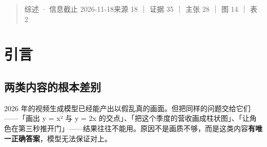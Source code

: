 
\begin{quote}\small
综述 · 信息截止 2026-11-18来源 18 ｜ 证据 35 ｜ 主张 28 ｜ 图 14 ｜ 表 2

\end{quote}

\begin{abstract}

让 AI 生成视频，主流路线是端到端扩散模型：输入文本或图像，直接输出像素。但有一类内容它系统性做不好——精确的公式、正确的图表、规则一致的交互、与画面事件严格同步的旁白。这些内容的共同点是\textbf{存在唯一正确答案}，而像素模型只能给出「看起来像」的结果。


于是出现了另一条路线：让 agent 写一段\textbf{程序}（Manim、Blender Python、SVG/CSS、图形 DSL），由确定性渲染器把它变成视频。本文系统梳理了这条路线上的 18 项代表工作，回答三个问题：这条路线为什么成立、它现在做到什么程度、它的边界在哪。为了让「框架结构」不流于文字描述，本文为全部 18 个工作按 method 章节自绘了示意图（图 5-\hspace{0pt}图 16），并置对照其切点差异。


本文的核心论断是：\textbf{代码中间表示的价值不在画质，而在于它把「视频生成」转成了三个可判定的问题——可编译、可对齐、可复现。} 这三条使验证可以自动化，从而让闭环自我改进成为可能。这正是端到端像素模型难以获得的能力。


但本文同时必须指出这条路线最尖锐的两个反证。其一，MaLiang-Harness 定义的 Program-to-Visual (P2V) gap 说明：\textbf{程序可以正确执行，却完全违背用户的视觉要求}，故「编译通过」不构成验收。其二，VibePrevisBench 观测到 \textbf{agent 会查看自己的渲染，却改不对错误}——这直接反驳了「给了视觉反馈就能自我纠正」的乐观假设。


本文据此主张：这一族当前的真实瓶颈不在生成侧，而在\textbf{「把视觉差异翻译成代码修改」}这一步。谁先解决它，谁就拿到通往更高自动化的钥匙。


\textbf{关键词}：代码生成视频；程序化动画；Manim；Blender；agentic 生成；可验证性



\end{abstract}
\section{引言}

\subsection{两类内容的根本差别}

2026 年的视频生成模型已经能产出以假乱真的画面。但把同样的问题交给它们——「画出 y = x² 与 y = 2x 的交点」、「把这个季度的营收画成柱状图」、「让角色在第三秒推开门」——结果往往不能用。原因不是画质不够，而是这类内容\textbf{有唯一正确答案}，模型无法保证对上。


